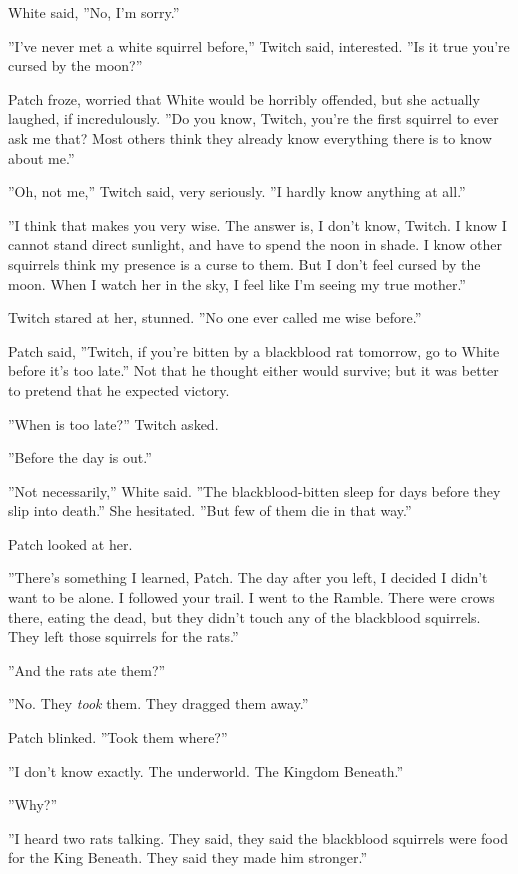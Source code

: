 \documentclass[12pt]{book}
\begin{document}
White said, ''No, I'm sorry.''

''I've never met a white squirrel before,'' Twitch said, interested. ''Is it true you're cursed by the moon?''

Patch froze, worried that White would be horribly offended, but she actually laughed, if incredulously. ''Do you know, Twitch, you're the first squirrel to ever ask me that? Most others think they already know everything there is to know about me.''

''Oh, not me,'' Twitch said, very seriously. ''I hardly know anything at all.''

''I think that makes you very wise. The answer is, I don't know, Twitch. I know I cannot stand direct sunlight, and have to spend the noon in shade. I know other squirrels think my presence is a curse to them. But I don't feel cursed by the moon. When I watch her in the sky, I feel like I'm seeing my true mother.''

Twitch stared at her, stunned. ''No one ever called me wise before.''

Patch said, ''Twitch, if you're bitten by a blackblood rat tomorrow, go to White before it's too late.'' Not that he thought either would survive; but it was better to pretend that he expected victory.

''When is too late?'' Twitch asked.

''Before the day is out.''

''Not necessarily,'' White said. ''The blackblood-bitten sleep for days before they slip into death.'' She hesitated. ''But few of them die in that way.''

Patch looked at her.

''There's something I learned, Patch. The day after you left, I decided %
I didn't want to be alone. I followed your trail. I went to the Ramble. There were crows there, eating the dead, but they didn't touch any of the blackblood squirrels. They left those squirrels for the rats.''

''And the rats ate them?''

''No. They {\it took} them. They dragged them away.''

Patch blinked. ''Took them where?''

''I don't know exactly. The underworld. The Kingdom Beneath.''

''Why?''

''I heard two rats talking. They said, they said the blackblood squirrels were food for the King Beneath. They said they made him stronger.''
\end{document}
